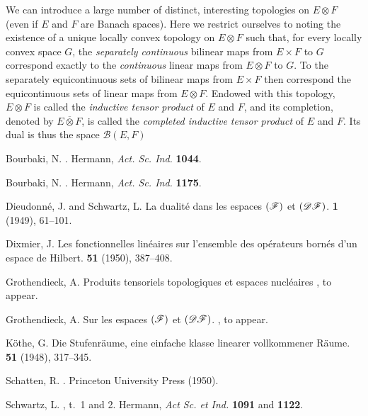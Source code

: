 \documentclass{article}
\theoremstyle{plain}
\newcommand{\sBB}{\mathscr{B}}
\newcommand{\DF}{\mbox{\normalfont($\mathscr{DF}$)}}
\newcommand{\FF}{\mbox{\normalfont($\mathscr{F}$)}}
\newcommand{\lotimes}{\overline{\otimes}}
\newcommand{\oldpage}[1]{\marginpar{\footnotesize$\Big\vert$ \textit{p.~#1}}}
\begin{document}
We can introduce a large number of distinct, interesting topologies on $E\otimes F$ (even if $E$ and $F$ are Banach spaces).
Here we restrict ourselves to noting the existence of a unique locally convex topology on $E\otimes F$ such that, for every locally convex space $G$, the \emph{separately continuous} bilinear maps from $E\times F$ to $G$ correspond exactly to the \emph{continuous} linear maps from $E\otimes F$ to $G$.
To the separately equicontinuous sets of bilinear maps from $E\times F$ then correspond the equicontinuous sets of linear maps from $E\otimes F$.
Endowed with this topology,
\oldpage{93}
$E\otimes F$ is called the \emph{inductive tensor product} of $E$ and $F$, and its completion, denoted by $E\lotimes F$, is called the \emph{completed inductive tensor product} of $E$ and $F$.
Its dual is thus the space $\sBB(E,F)$






\nocite{*}

\begin{thebibliography}{9}

  {Bourbaki, N.}
  .
  \newblock Hermann, {\em Act. Sc. Ind.} \textbf{1044}.

  {Bourbaki, N.}
  .
  \newblock Hermann, {\em Act. Sc. Ind.} \textbf{1175}.

  {Dieudonn\'{e}, J. and Schwartz, L.}
  \newblock La dualit\'{e} dans les espaces $\FF$ et $\DF$.
   \textbf{1} (1949), 61--101.

  {Dixmier, J.}
  \newblock Les fonctionnelles lin\'{e}aires sur l'ensemble des op\'{e}rateurs born\'{e}s d'un espace de Hilbert.
   \textbf{51} (1950), 387--408.

  {Grothendieck, A.}
  \newblock Produits tensoriels topologiques et espaces nucl\'{e}aires
  , to appear.

  {Grothendieck, A.}
  \newblock Sur les espaces $\FF$ et $\DF$.
  , to appear.

  {K\"{o}the, G.}
  \newblock Die Stufenr\"{a}ume, eine einfache klasse linearer vollkommener R\"{a}ume.
   \textbf{51} (1948), 317--345.

  {Schatten, R.}
  .
  \newblock Princeton University Press (1950).

  {Schwartz, L.}
  , t.~1 and 2.
  \newblock Hermann, {\em Act Sc. et Ind.} \textbf{1091} and \textbf{1122}.

\end{thebibliography}
\end{document}
